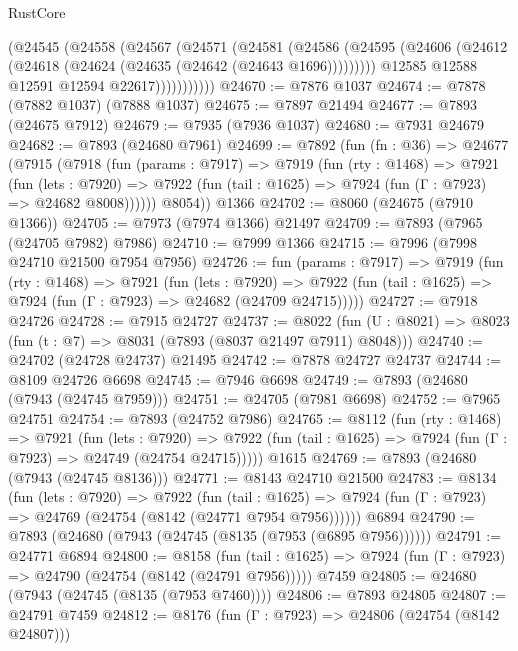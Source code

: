 \begin{lexlean}{RustCore}
\begin{coremodule}
                (@24545
                  (@24558
                    (@24567
                      (@24571
                        (@24581
                          (@24586
                            (@24595
                              (@24606 (@24612 (@24618 (@24624 (@24635 (@24642 (@24643 @1696)))))))))
                          @12585
                          @12588
                          @12591
                          @12594
                          @22617)))))))))))
@24670 := @7876 @1037
@24674 := @7878 (@7882 @1037) (@7888 @1037)
@24675 := @7897 @21494
@24677 := @7893 (@24675 @7912)
@24679 := @7935 (@7936 @1037)
@24680 := @7931 @24679
@24682 := @7893 (@24680 @7961)
@24699 := @7892
    (fun (fn : @36) =>
    @24677
      (@7915
        (@7918
          (fun (params : @7917) =>
          @7919
            (fun (rty : @1468) =>
            @7921
              (fun (lets : @7920) =>
              @7922 (fun (tail : @1625) => @7924 (fun (Γ : @7923) => @24682 @8008))))))
        @8054))
    @1366
@24702 := @8060 (@24675 (@7910 @1366))
@24705 := @7973 (@7974 @1366) @21497
@24709 := @7893 (@7965 (@24705 @7982) @7986)
@24710 := @7999 @1366
@24715 := @7996 (@7998 @24710 @21500 @7954 @7956)
@24726 := fun (params : @7917) =>
  @7919
    (fun (rty : @1468) =>
    @7921
      (fun (lets : @7920) =>
      @7922 (fun (tail : @1625) => @7924 (fun (Γ : @7923) => @24682 (@24709 @24715)))))
@24727 := @7918 @24726
@24728 := @7915 @24727
@24737 := @8022
    (fun (U : @8021) => @8023 (fun (t : @7) => @8031 (@7893 (@8037 @21497 @7911) @8048)))
@24740 := @24702 (@24728 @24737) @21495
@24742 := @7878 @24727 @24737
@24744 := @8109 @24726 @6698
@24745 := @7946 @6698
@24749 := @7893 (@24680 (@7943 (@24745 @7959)))
@24751 := @24705 (@7981 @6698)
@24752 := @7965 @24751
@24754 := @7893 (@24752 @7986)
@24765 := @8112
    (fun (rty : @1468) =>
    @7921
      (fun (lets : @7920) =>
      @7922 (fun (tail : @1625) => @7924 (fun (Γ : @7923) => @24749 (@24754 @24715)))))
    @1615
@24769 := @7893 (@24680 (@7943 (@24745 @8136)))
@24771 := @8143 @24710 @21500
@24783 := @8134
    (fun (lets : @7920) =>
    @7922
      (fun (tail : @1625) =>
      @7924 (fun (Γ : @7923) => @24769 (@24754 (@8142 (@24771 @7954 @7956))))))
    @6894
@24790 := @7893 (@24680 (@7943 (@24745 (@8135 (@7953 (@6895 @7956))))))
@24791 := @24771 @6894
@24800 := @8158
    (fun (tail : @1625) => @7924 (fun (Γ : @7923) => @24790 (@24754 (@8142 (@24791 @7956)))))
    @7459
@24805 := @24680 (@7943 (@24745 (@8135 (@7953 @7460))))
@24806 := @7893 @24805
@24807 := @24791 @7459
@24812 := @8176 (fun (Γ : @7923) => @24806 (@24754 (@8142 @24807)))

\end{coremodule}
\end{lexlean}
